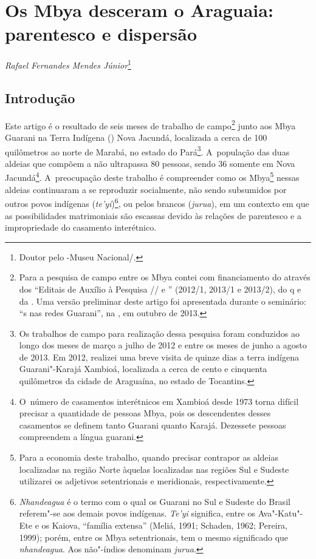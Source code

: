 \chapter{Os Mbya desceram o Araguaia: parentesco e dispersão}
\begin{flushright}
\emph{Rafael Fernandes Mendes Júnior}\footnote{Doutor pelo -Museu
Nacional/.}
\end{flushright}
\medskip

\section{Introdução}

Este artigo é o resultado de seis meses de trabalho de
campo\footnote{Para a pesquisa de campo entre os Mbya contei com
financiamento do  através dos ``Editais de Auxílio à Pesquisa
// e '' (2012/1, 2013/1 e 2013/2), do q e da .
Uma versão preliminar deste artigo foi apresentada durante o seminário:
``s nas redes Guarani'', na , em outubro de 2013.} junto aos Mbya
Guarani na Terra Indígena () Nova Jacundá, localizada a cerca de 100
quilômetros ao norte de Marabá, no estado do Pará\footnote{Os trabalhos
de campo para realização dessa pesquisa foram conduzidos ao longo dos
meses de março a julho de 2012 e entre os meses de junho a agosto de
2013. Em 2012, realizei uma breve visita de quinze dias a terra
indígena Guarani"-Karajá Xambioá, localizada a cerca de cento e
cinquenta quilômetros da cidade de Araguaína, no estado de Tocantins.}.
A~população das duas aldeias que compõem a  não ultrapassa 80
pessoas, sendo 36 somente em Nova Jacundá\footnote{O~número de
casamentos interétnicos em Xambioá desde 1973 torna difícil precisar a
quantidade de pessoas Mbya, pois os descendentes desses casamentos se
definem tanto Guarani quanto Karajá. Dezessete pessoas compreendem a
língua guarani.}. A~preocupação deste trabalho é compreender como os
Mbya\footnote{Para a economia deste trabalho, quando precisar contrapor
as aldeias localizadas na região Norte àquelas localizadas nas regiões
Sul e Sudeste utilizarei os adjetivos setentrionais e meridionais,
respectivamente.} nessas aldeias continuaram a se reproduzir
socialmente, não sendo subsumidos por outros povos indígenas
(\emph{te’yi})\footnote{\emph{Nhandeagua} é o termo com o qual os Guarani no Sul e
Sudeste do Brasil referem"-se aos demais povos indígenas. \emph{Te’yi}
significa, entre os Ava"-Katu"-Ete e os Kaiova, ``família extensa'' (Meliá,
1991; Schaden, 1962; Pereira, 1999); porém, entre os Mbya setentrionais,
tem o mesmo significado que \emph{nhandeagua}. Aos não"-índios denominam
\emph{jurua}.}, ou pelos brancos (\emph{jurua}), em um contexto em que as
possibilidades matrimoniais são escassas devido às relações de
parentesco e a impropriedade do casamento interétnico.

